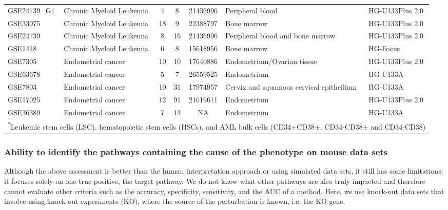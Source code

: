 \begin{landscape}
\begin{longtable}{lp{4cm}cccp{4cm}l}
GSE24739\_G1	&Chronic Myeloid Leukemia	&4	&8	&21436996	&Peripheral blood	&HG-U133Plus 2.0 \\
GSE33075	&Chronic Myeloid Leukemia	&18	&9	&22388797	&Bone marrow	&HG-U133Plus 2.0 \\
GSE24739	&Chronic Myeloid Leukemia	&8	&16	&21436996	&Peripheral blood and bone marrow	&HG-U133Plus 2.0\\
GSE1418	&Chronic Myeloid Leukemia	&6	&8	&15618956	&Bone marrow	&HG-Focus\\
GSE7305	&Endometrial cancer	&10	&10	&17640886	&Endometrium/Ovarian tissue	&HG-U133Plus 2.0\\
GSE63678	&Endometrial cancer	&5	&7	&26559525	&Endometrium	&HG-U133A\\
GSE7803	&Endometrial cancer	&10	&31	&17974957	&Cervix and squamous cervical epitheilium	&HG-U133A\\
GSE17025	&Endometrial cancer	&12	&91	&21619611	&Endometrium	&HG-U133Plus 2.0\\
GSE36389	&Endometrial cancer	&7	&13	&NA	&Endometrium	&HG-U133A\\
\hline
\multicolumn{7}{l}{\textsuperscript{*}\footnotesize{Leukemic stem cells (LSC), hematopoietic stem cells (HSCs), and AML bulk cells (CD34+CD38+, CD34-CD38+ and CD34-CD38)}}
\label{table:HumanDatasets}
\end{longtable}
\end{landscape}



\subsubsection{Ability to identify the pathways containing the cause of the phenotype on mouse data sets}
\label{KOsubsubsection}

Although the above assessment is better than the human interpretation approach or using simulated data sets, it still has some limitations: it focuses solely on one true positive, the target pathway. We do not know what other pathways are also truly impacted and therefore cannot evaluate other criteria such as the accuracy, specificity, sensitivity, and the AUC of a method. Here, we use knock-out data sets that involve using knock-out experiments (KO), where the source of the perturbation is known, i.e. the KO gene.

